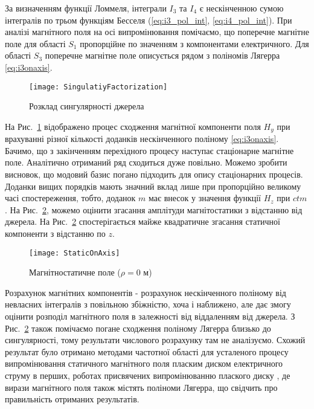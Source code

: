 За визначенням функції Ломмеля, інтеграли $ I_3 $ та $ I_4 $ є 
нескінченною сумою інтегралів по трьом функціям Бесселя 
(\eqref{eq:i3_pol_int}, \eqref{eq:i4_pol_int}). При аналізі магнітного 
поля на осі випромінювання помічаємо, що поперечне магнітне поле для 
області $ S_1 $ пропорційне по значенням з компонентами 
електричного. Для області $ S_3 $ поперечне магнітне поле описується 
рядом з поліномів Лягерра \eqref{eq:i3onaxis}.

\begin{figure}[h] \begin{center}
\texttt{[image: SingulatiyFactorization]}
\caption{Розклад сингулярності джерела} \label{fig:singulatiy_factorization}
\end{center} \end{figure}

На Рис.~\ref{fig:singulatiy_factorization} відображено процес сходження 
магнітної компоненти поля $ H_y $ при врахуванні різної кількості доданків
нескінченного поліному \eqref{eq:i3onaxis}. Бачимо, що з закінченням 
перехідного процесу наступає стаціонарне магнітне поле. Аналітично отриманий 
ряд сходиться дуже повільно. Можемо зробити висновок, що модовий базис 
погано підходить для опису стаціонарних процесів. Доданки вищих порядків 
мають значний вклад лише при пропорційно великому часі спостереження,
тобто, доданок $ m $ має внесок у значення функції $ H_z $ при $ ctm $.
На Рис.~\ref{fig:emp_h_z}, можемо оцінити згасання амплітуди 
магнітостатики з відстанню від джерела. На Рис.~\ref{fig:emp_h_z} 
спостерігається майже квадратичне згасання статичної 
компоненти з відстанню по $ z $. 

\begin{figure}[h] \begin{center}
\texttt{[image: StaticOnAxis]}
\caption{Магнітностатичне поле ($ \rho = 0 $ м)} \label{fig:emp_h_z}
\end{center} \end{figure}

Розрахунок магнітних компонентів - розрахунок нескінченного 
поліному від невласних інтегралів з повільною збіжністю,
хоча і наближено, але дає змогу оцінити розподіл магнітного поля в 
залежності від віддаленням від джерела. З Рис.~\ref{fig:emp_h_z} також 
помічаємо погане сходження поліному Лягерра близько до сингулярності, тому 
результати числового розрахунку там не аналізуємо. Схожий результат було 
отримано методами частотної області для усталеного процесу випромінювання 
статичного магнітного поля пласким диском електричного струму в перших, 
роботах присвячених випромінюванню плаского диску \cite{imp:BaumIN0009}, 
де вирази магнітного поля також містять поліноми Лягерра, що свідчить про 
правильність отриманих результатів.

